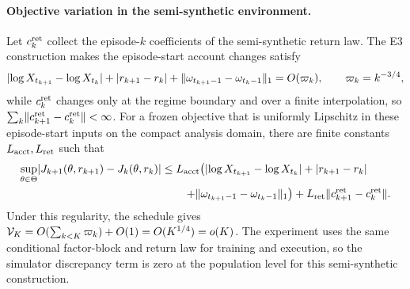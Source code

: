 \paragraph{Objective variation in the semi-synthetic environment.}
Let $c_k^{\rm ret}$ collect the episode-$k$ coefficients of the semi-synthetic return law.  The E3 construction makes the episode-start account changes satisfy
\[
 \lvert\log X_{t_{k+1}}-\log X_{t_k}\rvert
 +\lvert r_{k+1}-r_k\rvert
 +\lVert\omega_{t_{k+1}-1}-\omega_{t_k-1}\rVert_1
 =O(\varpi_k),
 \qquad \varpi_k=k^{-3/4},
\]
while $c_k^{\rm ret}$ changes only at the regime boundary and over a finite interpolation, so
$\sum_k\lVert c_{k+1}^{\rm ret}-c_k^{\rm ret}\rVert<\infty$.
For a frozen objective that is uniformly Lipschitz in these episode-start inputs on the compact analysis domain, there are finite constants $L_{\rm acct},L_{\rm ret}$ such that
\[
\begin{aligned}
 \sup_{\theta\in\Theta}
 \lvert J_{k+1}(\theta,r_{k+1})-J_k(\theta,r_k)\rvert
 &\le
 L_{\rm acct}\!\left(
 \lvert\log X_{t_{k+1}}-\log X_{t_k}\rvert
 +\lvert r_{k+1}-r_k\rvert
 \right.\\
 &\qquad\left.
 +\lVert\omega_{t_{k+1}-1}-\omega_{t_k-1}\rVert_1
 \right)
 +L_{\rm ret}\lVert c_{k+1}^{\rm ret}-c_k^{\rm ret}\rVert.
\end{aligned}
\]
Under this regularity, the schedule gives
$\mathcal V_K=O(\sum_{k<K}\varpi_k)+O(1)=O(K^{1/4})=o(K)$.
The experiment uses the same conditional factor-block and return law for training and execution, so the simulator discrepancy term is zero at the population level for this semi-synthetic construction.
